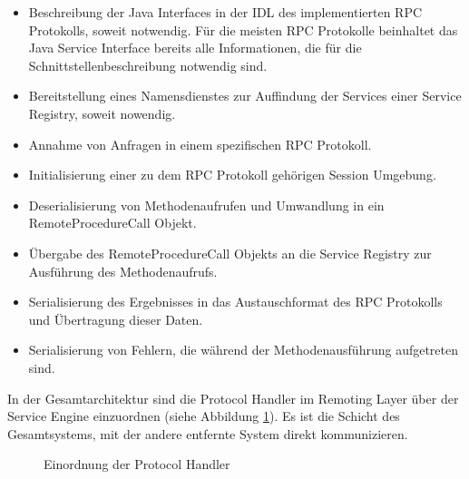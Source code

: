 \begin{itemize}
  \item Beschreibung der Java Interfaces in der \ac{IDL} des
  implementierten \ac{RPC} Protokolls, soweit notwendig. Für die meisten
  \ac{RPC} Protokolle beinhaltet das Java Service Interface bereits alle
  Informationen, die für die Schnittstellenbeschreibung notwendig sind.
  \item Bereitstellung eines Namensdienstes zur Auffindung der Services
  einer Service Registry, soweit nowendig.
  \item Annahme von Anfragen in einem spezifischen \ac{RPC} Protokoll.
  \item Initialisierung einer zu dem \ac{RPC} Protokoll gehörigen Session
  Umgebung.
  \item Deserialisierung von Methodenaufrufen und Umwandlung in ein
  RemoteProcedureCall Objekt.
  \item Übergabe des RemoteProcedureCall Objekts an die Service Registry zur
  Ausführung des Methodenaufrufs.
  \item Serialisierung des Ergebnisses in das Austauschformat des \ac{RPC}
  Protokolls und Übertragung dieser Daten.
  \item Serialisierung von Fehlern, die während der Methodenausführung
  aufgetreten sind.
\end{itemize}

In der Gesamtarchitektur sind die Protocol Handler im Remoting Layer über der
Service Engine einzuordnen (siehe Abbildung \ref{ill:protocolhandler}). Es ist
die Schicht des Gesamtsystems, mit der andere entfernte System direkt
kommunizieren.

\begin{figure}[bth]
	\caption{Einordnung der Protocol Handler}
	\label{ill:protocolhandler}
\end{figure}

